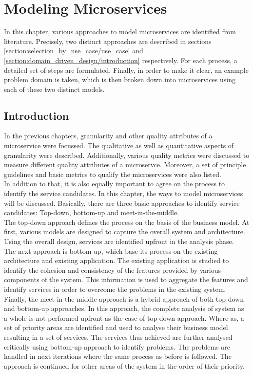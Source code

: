 \chapter{Modeling Microservices}\label{chapter:service_candidate}
In this chapter, various approaches to model microservices are identified from literature. Precisely, two distinct approaches are described in sections \ref{section:selection_by_use_case/use_case} and \ref{section:domain_driven_design/introduction} respectively. For each process, a detailed set of steps are formulated. Finally, in order to make it clear, an example problem domain is taken, which is then broken down into microservices using each of these two distinct models.
\section{Introduction}\label{section:service_candidate/introduction}
In the previous chapters, granularity and other quality attributes of a microservice were focussed. The qualitative as well as quantitative aspects of granularity were described. Additionally, various quality metrics were discussed to measure different quality attributes of a microservce. Moreover, a set of principle guidelines and basic metrics to qualify the microservices were also listed.\\
In addition to that, it is also equally important to agree on the process to identify the service candidates. In this chapter, the ways to model microservices will be discussed.
Basically, there are three basic approaches to identify service candidates: Top-down, bottom-up and meet-in-the-middle. \\
The top-down approach defines the process on the basis of the business model. At first, various models are designed to capture the overall system and architecture. Using the overall design, services are identified upfront in the analysis phase.\\
The next approach is bottom-up, which base its process on the existing architecture and existing application. The existing application is studied to identify the cohesion and consistency of the features provided by various components of the system. This information is used to aggregate the features and identify services in order to overcome the problems in the existing system.\\
Finally, the meet-in-the-middle approach is a hybrid approach of both top-down and bottom-up approaches. In this approach, the complete analysis of system as a whole is not performed upfront as the case of top-down approach. Where as, a set of priority areas are identified and used to analyse their business model resulting in a set of services. The services thus achieved are further analysed critically using bottom-up approach to identify problems. The problems are handled in next iterations where the same process as before is followed. The approach is continued for other areas of the system in the order of their priority.\cite{Pierre-Reldin:2007aa}\cite{Arsanjani:2004aa}\\
